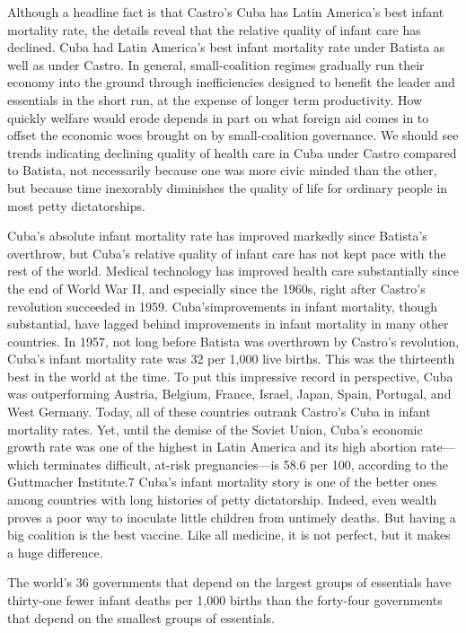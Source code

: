 \documentclass[10pt]{article}
\begin{document}
{\large Although a headline fact is that Castro's Cuba has Latin America's best
infant mortality rate, the details reveal that the relative quality of infant
care has declined. Cuba had Latin America's best infant mortality rate under
Batista as well as under Castro. In general, small-coalition regimes gradually
run their economy into the ground through inefficiencies designed to benefit the
leader and essentials in the short run, at the expense of longer term
productivity. How quickly welfare would erode depends in part on what foreign aid
comes in to offset the economic woes brought on by small-coalition governance. We
should see trends indicating declining quality of health care in Cuba under
Castro compared to Batista, not necessarily because one was more civic minded
than the other, but because time inexorably diminishes the quality of life for
ordinary people in most petty dictatorships.}

{\large Cuba's absolute infant mortality rate has improved markedly since
Batista's overthrow, but Cuba's relative quality of infant care has not kept pace
with the rest of the world. Medical technology has improved health care
substantially since the end of World War II, and especially since the 1960s,
right after Castro's revolution succeeded in 1959. Cuba'simprovements in infant
mortality, though substantial, have lagged behind improvements in infant
mortality in many other countries. In 1957, not long before Batista was
overthrown by Castro's revolution, Cuba's infant mortality rate was 32 per 1,000
live births. This was the thirteenth best in the world at the time. To put this
impressive record in perspective, Cuba was outperforming Austria, Belgium,
France, Israel, Japan, Spain, Portugal, and West Germany. Today, all of these
countries outrank Castro's Cuba in infant mortality rates. Yet, until the demise
of the Soviet Union, Cuba's economic growth rate was one of the highest in Latin
America and its high abortion rate---which terminates difficult, at-risk
pregnancies---is 58.6 per 100, according to the Guttmacher Institute.7 Cuba's
infant mortality story is one of the better ones among countries with long
histories of petty dictatorship. Indeed, even wealth proves a poor way to
inoculate little children from untimely deaths. But having a big coalition is the
best vaccine. Like all medicine, it is not perfect, but it makes a huge
difference.}

{\large The world's 36 governments that depend on the largest groups of
essentials have thirty-one fewer infant deaths per 1,000 births than the
forty-four governments that depend on the smallest groups of essentials.}
\end{document}
